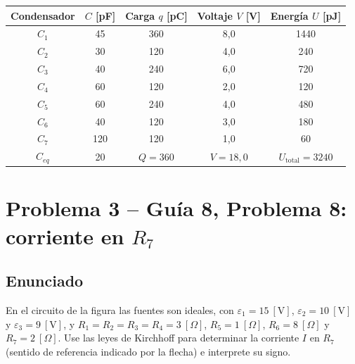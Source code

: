 \documentclass[12pt,letterpaper]{article}
\begin{document}
\begin{center}
\renewcommand{\arraystretch}{1.2}
\begin{tabular}{|c|c|c|c|c|}
\hline
\textbf{Condensador} & \textbf{$C$ [pF]} & \textbf{Carga $q$ [pC]} & \textbf{Voltaje $V$ [V]} & \textbf{Energ\'ia $U$ [pJ]} \\
\hline
$C_1$ & 45  & 360 & 8{,}0 & 1440 \\
$C_2$ & 30  & 120 & 4{,}0 & 240 \\
$C_3$ & 40  & 240 & 6{,}0 & 720 \\
$C_4$ & 60  & 120 & 2{,}0 & 120 \\
$C_5$ & 60  & 240 & 4{,}0 & 480 \\
$C_6$ & 40  & 120 & 3{,}0 & 180 \\
$C_7$ & 120 & 120 & 1{,}0 & 60 \\
\hline
$C_{eq}$ & 20 & $Q = 360$ & $V = 18{,}0$ & $U_{\text{total}} = 3240$ \\
\hline
\end{tabular}
\end{center}


\newpage

\section*{Problema 3 -- Gu\'ia 8, Problema 8: corriente en $R_7$}

\subsection*{Enunciado}

En el circuito de la figura las fuentes son ideales, con $\varepsilon_1 = 15\ [\text{V}]$,
$\varepsilon_2 = 10\ [\text{V}]$ y $\varepsilon_3 = 9\ [\text{V}]$, y
$R_1 = R_2 = R_3 = R_4 = 3\ [\Omega]$, $R_5 = 1\ [\Omega]$, $R_6 = 8\ [\Omega]$ y
$R_7 = 2\ [\Omega]$. Use las leyes de Kirchhoff para determinar la corriente $I$ en $R_7$ (sentido de
referencia indicado por la flecha) e interprete su signo.
\end{document}
